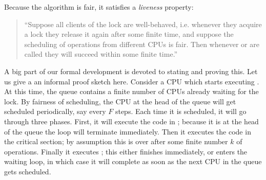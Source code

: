 Because the algorithm is fair, it satisfies a \emph{liveness}
property:\begin{quote}
``Suppose all clients of the lock are well-behaved, i.e. whenever they acquire a lock they release it again after some finite time, and suppose the scheduling of operations from different CPUs is fair. Then  whenever  or  are called they will succeed within some finite time.''
\end{quote}
A big part of our formal development is devoted to stating and proving
this.
Let us give a an informal proof sketch here. 
Consider a CPU which starts executing .
At this time, the queue contains a finite number of CPUs already waiting for the lock.
By fairness of scheduling, the CPU at the head of the queue will get scheduled periodically, say every $F$ steps. Each time it is scheduled, it will go through three phases. 
First, it will execute the code in ; because it is at the head of the queue the loop will terminate immediately. 
Then it executes the code in the critical section; by assumption this is over after some finite number $k$ of operations. 
Finally it executes ; this either finishes immediately, or enters the waiting loop, in which case it will complete as soon as the next CPU in the queue gets scheduled. 
